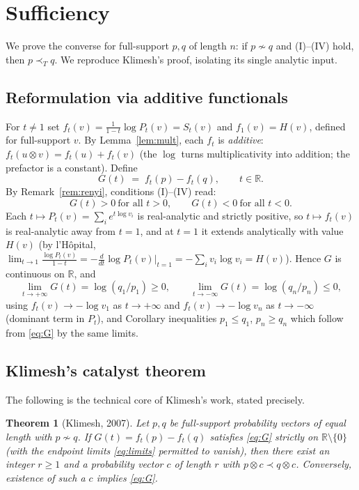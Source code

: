 \documentclass{amsart}
\theoremstyle{plain}
\newtheorem{theorem}{Theorem}
\theoremstyle{definition}
\newcommand{\R}{\mathbb{R}}
\newcommand{\maj}{\prec}
\newcommand{\trump}{\prec_T}
\begin{document}
\section{Sufficiency}\label{sec:suff}

We prove the converse for full-support $p,q$ of length $n$: if $p\not\sim q$ and
\textnormal{(I)--(IV)} hold, then $p\trump q$. We reproduce Klimesh's proof, isolating
its single analytic input.

\subsection{Reformulation via additive functionals}
For $t\ne1$ set $f_t(v)=\frac{1}{1-t}\log P_t(v)=S_t(v)$ and $f_1(v)=H(v)$, defined for
full-support $v$. By Lemma~\ref{lem:mult}, each $f_t$ is \emph{additive}:
$f_t(u\otimes v)=f_t(u)+f_t(v)$ (the $\log$ turns multiplicativity into addition; the
prefactor is a constant). Define
\[
   G(t)\;=\;f_t(p)-f_t(q),\qquad t\in\R .
\]
By Remark~\ref{rem:renyi}, conditions (I)--(IV) read:
\begin{equation}\label{eq:G}
   G(t)>0\ \text{for all }t>0,\qquad G(t)<0\ \text{for all }t<0 .
\end{equation}
Each $t\mapsto P_t(v)=\sum_i e^{t\log v_i}$ is real-analytic and strictly positive, so
$t\mapsto f_t(v)$ is real-analytic away from $t=1$, and at $t=1$ it extends
analytically with value $H(v)$ (by l'Hôpital,
$\lim_{t\to1}\frac{\log P_t(v)}{1-t}=-\frac{d}{dt}\log P_t(v)\big|_{t=1}
=-\sum_i v_i\log v_i=H(v)$). Hence $G$ is continuous on $\R$, and
\begin{equation}\label{eq:limits}
  \lim_{t\to+\infty}G(t)=\log(q_1/p_1)\ge0,\qquad
  \lim_{t\to-\infty}G(t)=\log(q_n/p_n)\le0,
\end{equation}
using $f_t(v)\to-\log v_1$ as $t\to+\infty$ and $f_t(v)\to-\log v_n$ as $t\to-\infty$
(dominant term in $P_t$), and Corollary inequalities $p_1\le q_1$, $p_n\ge q_n$ which
follow from \eqref{eq:G} by the same limits.

\subsection{Klimesh's catalyst theorem}
The following is the technical core of Klimesh's work, stated precisely.

\begin{theorem}[Klimesh, 2007]\label{thm:klimesh}
Let $p,q$ be full-support probability vectors of equal length with $p\not\sim q$. If
$G(t)=f_t(p)-f_t(q)$ satisfies \eqref{eq:G} \emph{strictly on $\R\setminus\{0\}$}
\textnormal{(}with the endpoint limits \eqref{eq:limits} permitted to vanish\textnormal{)},
then there exist an integer $r\ge1$ and a probability vector $c$ of length $r$ with
$p\otimes c\maj q\otimes c$. Conversely, existence of such a $c$ implies \eqref{eq:G}.
\end{theorem}
\end{document}
